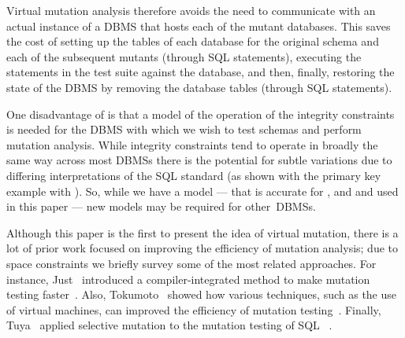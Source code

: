 
Virtual mutation analysis therefore avoids the need to communicate with an actual instance of a DBMS that hosts each of the mutant databases. This saves the cost of setting up the tables of each database for the original schema and each of the subsequent mutants (through SQL  statements), executing the \INSERT statements in the test suite against the database, and then, finally, restoring the state of the DBMS by removing the database tables (through SQL  statements).

One disadvantage of \vma is that a model of the operation of the integrity constraints is needed for the DBMS with which we wish to test schemas and perform mutation analysis. While integrity constraints tend to operate in broadly the same way across most DBMSs there is the potential for subtle variations due to differing interpretations of the SQL standard (as shown with the primary key example with \SQLite). So, while we have a model --- that is accurate for \HyperSQL, \Postgres and \SQLite and used in this paper --- new models may be required for \mbox{other DBMSs}.

 Although this paper is the first to present the idea of virtual mutation, there is a lot of prior work focused on improving the efficiency of mutation analysis; due to space constraints we briefly survey some of the most related approaches. For instance, Just \etal~introduced a compiler-integrated method to make mutation testing faster~\cite{Just2011}. Also, Tokumoto \etal~showed how various techniques, such as the use of virtual machines, can improved the efficiency of mutation testing~\cite{Tokumoto2016}. Finally, Tuya \etal~applied selective mutation to the mutation testing of SQL \SELECTs~\cite{Tuya2007}.


